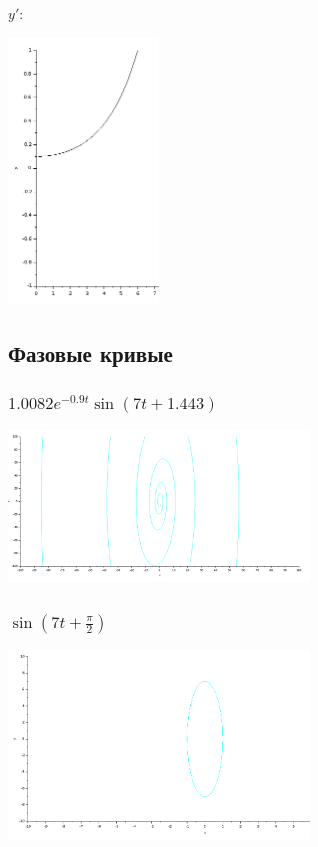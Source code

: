 \documentclass[12pt, a4paper] {ncc}
\begin{document}
$y'$:
\begin{center}
\includegraphics[width=0.3\textwidth]{6y1}
\end{center}

\subsection{Фазовые кривые}
\subsubsection{ $ 1.0082 e^{-0.9t} \sin(7t + 1.443)$}

\begin{center}
\includegraphics[width=0.6\textwidth]{1f}
\end{center}

\subsubsection{  $ \sin(7t + \frac {\pi}{2})$}
\begin{center}
\includegraphics[width=0.6\textwidth]{2f}
\end{center}
\end{document}
